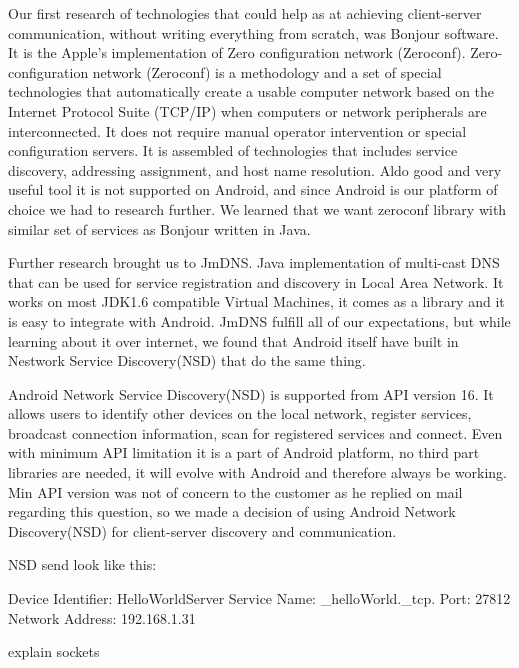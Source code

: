Our first research of technologies that could help as at achieving client-server communication, without writing everything from scratch, was Bonjour software. 
It is the Apple's implementation of Zero configuration network (Zeroconf). 
Zero-configuration network (Zeroconf)  is a methodology and a set of special technologies that automatically create a usable computer network based on the Internet Protocol Suite (TCP/IP) when computers or network peripherals are interconnected. 
It does not require manual operator intervention or special configuration servers.
It is assembled of technologies that includes service discovery, addressing assignment, and host name resolution.
Aldo good and very useful tool it is not supported on Android, and since Android is our platform of choice we had to research further. 
We learned that we want zeroconf library with similar set of services as Bonjour written in Java.


Further research brought us to JmDNS. Java implementation of multi-cast DNS that can be used for service registration and discovery in Local Area Network. 
It works on most JDK1.6 compatible Virtual Machines, it comes as a library and it is easy to integrate with Android. 
JmDNS fulfill all of our expectations, but while learning about it over internet, we found that Android itself have built in Nestwork Service Discovery(NSD) that do the same thing.


Android Network Service Discovery(NSD) is supported from API version 16. 
It allows users to identify other devices on the local network, register services, broadcast connection information, scan for registered services and connect.
Even with minimum API limitation it is a part of Android platform, no third part libraries are needed, it will evolve with Android and therefore always be working.
Min API version was not of concern to the customer as he replied on mail regarding this question, so we made a decision of using Android Network Discovery(NSD) for client-server discovery and communication.

NSD send look like this:

Device Identifier: HelloWorldServer
Service Name: \_helloWorld.\_tcp.
Port: 27812
Network Address: 192.168.1.31

explain sockets


